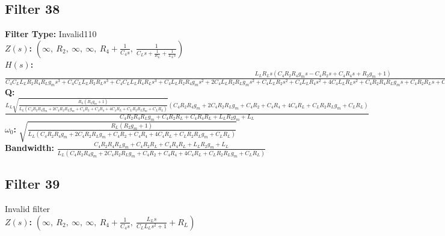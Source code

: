 \documentclass{article}
\begin{document}
\subsection*{Filter 38}
\textbf{Filter Type:} Invalid110 \\ 
\textbf{$Z(s)$:} $\left( \infty, \  R_{2}, \  \infty, \  \infty, \  R_{4} + \frac{1}{C_{4} s}, \  \frac{1}{C_{L} s + \frac{1}{R_{L}} + \frac{1}{L_{L} s}}\right)$ \\ 
\textbf{$H(s)$:} $\frac{L_{L} R_{L} s \left(C_{4} R_{2} R_{4} g_{m} s - C_{4} R_{2} s + C_{4} R_{4} s + R_{2} g_{m} + 1\right)}{C_{4} C_{L} L_{L} R_{2} R_{4} R_{L} g_{m} s^{3} + C_{4} C_{L} L_{L} R_{2} R_{L} s^{3} + C_{4} C_{L} L_{L} R_{4} R_{L} s^{3} + C_{4} L_{L} R_{2} R_{4} g_{m} s^{2} + 2 C_{4} L_{L} R_{2} R_{L} g_{m} s^{2} + C_{4} L_{L} R_{2} s^{2} + C_{4} L_{L} R_{4} s^{2} + 4 C_{4} L_{L} R_{L} s^{2} + C_{4} R_{2} R_{4} R_{L} g_{m} s + C_{4} R_{2} R_{L} s + C_{4} R_{4} R_{L} s + C_{L} L_{L} R_{2} R_{L} g_{m} s^{2} + C_{L} L_{L} R_{L} s^{2} + L_{L} R_{2} g_{m} s + L_{L} s + R_{2} R_{L} g_{m} + R_{L}}$ \\ 
\textbf{Q:} $\frac{L_{L} \sqrt{\frac{R_{L} \left(R_{2} g_{m} + 1\right)}{L_{L} \left(C_{4} R_{2} R_{4} g_{m} + 2 C_{4} R_{2} R_{L} g_{m} + C_{4} R_{2} + C_{4} R_{4} + 4 C_{4} R_{L} + C_{L} R_{2} R_{L} g_{m} + C_{L} R_{L}\right)}} \left(C_{4} R_{2} R_{4} g_{m} + 2 C_{4} R_{2} R_{L} g_{m} + C_{4} R_{2} + C_{4} R_{4} + 4 C_{4} R_{L} + C_{L} R_{2} R_{L} g_{m} + C_{L} R_{L}\right)}{C_{4} R_{2} R_{4} R_{L} g_{m} + C_{4} R_{2} R_{L} + C_{4} R_{4} R_{L} + L_{L} R_{2} g_{m} + L_{L}}$ \\ 
\textbf{$\omega_0$:} $\sqrt{\frac{R_{L} \left(R_{2} g_{m} + 1\right)}{L_{L} \left(C_{4} R_{2} R_{4} g_{m} + 2 C_{4} R_{2} R_{L} g_{m} + C_{4} R_{2} + C_{4} R_{4} + 4 C_{4} R_{L} + C_{L} R_{2} R_{L} g_{m} + C_{L} R_{L}\right)}}$ \\ 
\textbf{Bandwidth:} $\frac{C_{4} R_{2} R_{4} R_{L} g_{m} + C_{4} R_{2} R_{L} + C_{4} R_{4} R_{L} + L_{L} R_{2} g_{m} + L_{L}}{L_{L} \left(C_{4} R_{2} R_{4} g_{m} + 2 C_{4} R_{2} R_{L} g_{m} + C_{4} R_{2} + C_{4} R_{4} + 4 C_{4} R_{L} + C_{L} R_{2} R_{L} g_{m} + C_{L} R_{L}\right)}$ \\ 
\subsection*{Filter 39}
Invalid filter \\ 
\textbf{$Z(s)$:} $\left( \infty, \  R_{2}, \  \infty, \  \infty, \  R_{4} + \frac{1}{C_{4} s}, \  \frac{L_{L} s}{C_{L} L_{L} s^{2} + 1} + R_{L}\right)$ \\ 
\end{document}
